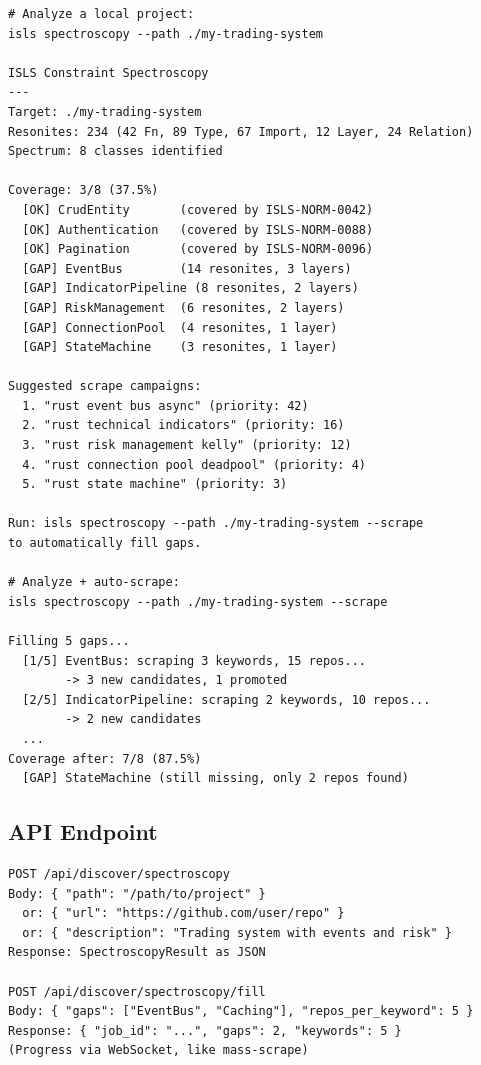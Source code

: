 \documentclass[11pt,a4paper]{article}
\begin{document}
\begin{lstlisting}[style=bash]
# Analyze a local project:
isls spectroscopy --path ./my-trading-system

ISLS Constraint Spectroscopy
---
Target: ./my-trading-system
Resonites: 234 (42 Fn, 89 Type, 67 Import, 12 Layer, 24 Relation)
Spectrum: 8 classes identified

Coverage: 3/8 (37.5%)
  [OK] CrudEntity       (covered by ISLS-NORM-0042)
  [OK] Authentication   (covered by ISLS-NORM-0088)
  [OK] Pagination       (covered by ISLS-NORM-0096)
  [GAP] EventBus        (14 resonites, 3 layers)
  [GAP] IndicatorPipeline (8 resonites, 2 layers)
  [GAP] RiskManagement  (6 resonites, 2 layers)
  [GAP] ConnectionPool  (4 resonites, 1 layer)
  [GAP] StateMachine    (3 resonites, 1 layer)

Suggested scrape campaigns:
  1. "rust event bus async" (priority: 42)
  2. "rust technical indicators" (priority: 16)
  3. "rust risk management kelly" (priority: 12)
  4. "rust connection pool deadpool" (priority: 4)
  5. "rust state machine" (priority: 3)

Run: isls spectroscopy --path ./my-trading-system --scrape
to automatically fill gaps.

# Analyze + auto-scrape:
isls spectroscopy --path ./my-trading-system --scrape

Filling 5 gaps...
  [1/5] EventBus: scraping 3 keywords, 15 repos...
        -> 3 new candidates, 1 promoted
  [2/5] IndicatorPipeline: scraping 2 keywords, 10 repos...
        -> 2 new candidates
  ...
Coverage after: 7/8 (87.5%)
  [GAP] StateMachine (still missing, only 2 repos found)
\end{lstlisting}

\subsection{API Endpoint}

\begin{lstlisting}[style=bash]
POST /api/discover/spectroscopy
Body: { "path": "/path/to/project" }
  or: { "url": "https://github.com/user/repo" }
  or: { "description": "Trading system with events and risk" }
Response: SpectroscopyResult as JSON

POST /api/discover/spectroscopy/fill
Body: { "gaps": ["EventBus", "Caching"], "repos_per_keyword": 5 }
Response: { "job_id": "...", "gaps": 2, "keywords": 5 }
(Progress via WebSocket, like mass-scrape)
\end{lstlisting}
\end{document}
